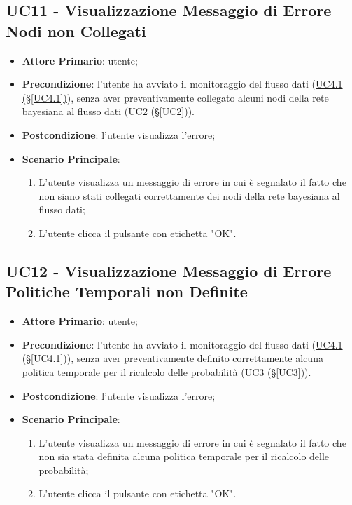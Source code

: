 \pagebreak

\subsection{UC11 - Visualizzazione Messaggio di Errore Nodi non Collegati}\label{UC11}
\begin{itemize}
\item \textbf{Attore Primario}: utente;
\item \textbf{Precondizione}: l'utente ha avviato il monitoraggio del flusso dati (\hyperref[UC4.1]{UC4.1 							(§\ref*{UC4.1})}), senza aver preventivamente collegato alcuni nodi della rete bayesiana al flusso dati 							(\hyperref[UC2]{UC2 (§\ref*{UC2})}).
\item \textbf{Postcondizione}: l'utente visualizza l'errore;
\item \textbf{Scenario Principale}: 
	\begin{enumerate}
	\item L'utente visualizza un messaggio di errore in cui è segnalato il fatto che non siano stati collegati 						correttamente dei nodi della rete bayesiana al flusso dati;
	\item L'utente clicca il pulsante con etichetta "OK".
	\end{enumerate}
\end{itemize}

\pagebreak

\subsection{UC12 - Visualizzazione Messaggio di Errore Politiche Temporali non Definite}\label{UC12}
\begin{itemize}
\item \textbf{Attore Primario}: utente;
\item \textbf{Precondizione}: l'utente ha avviato il monitoraggio del flusso dati (\hyperref[UC4.1]{UC4.1 							(§\ref*{UC4.1})}), senza aver preventivamente definito correttamente alcuna politica temporale per il ricalcolo delle probabilità (\hyperref[UC3]{UC3 (§\ref*{UC3})}).
\item \textbf{Postcondizione}: l'utente visualizza l'errore;
\item \textbf{Scenario Principale}: 
	\begin{enumerate}
	\item L'utente visualizza un messaggio di errore in cui è segnalato il fatto che non sia stata definita alcuna 				politica temporale per il ricalcolo delle probabilità;
	\item L'utente clicca il pulsante con etichetta "OK".
	\end{enumerate}
\end{itemize}

